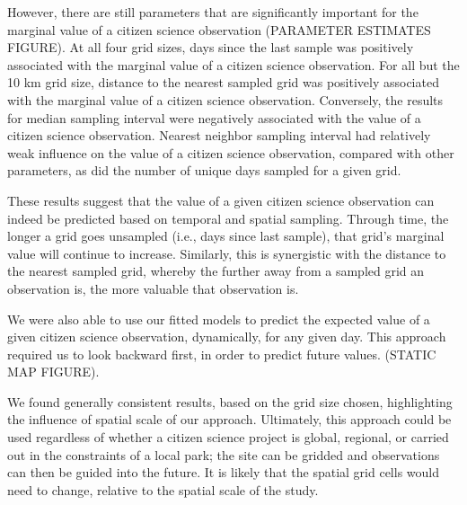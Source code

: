 \documentclass[9pt,twocolumn,twoside,lineno]{pnas-new}
\begin{document}
However, there are still parameters that are significantly important for the marginal value of a citizen science observation (PARAMETER ESTIMATES FIGURE). At all four grid sizes, days since the last sample was positively associated with the marginal value of a citizen science observation. For all but the 10 km grid size, distance to the nearest sampled grid was positively associated with the marginal value of a citizen science observation. Conversely, the results for median sampling interval were negatively associated with the value of a citizen science observation. Nearest neighbor sampling interval had relatively weak influence on the value of a citizen science observation, compared with other parameters, as did the number of unique days sampled for a given grid.

These results suggest that the value of a given citizen science observation can indeed be predicted based on temporal and spatial sampling. Through time, the longer a grid goes unsampled (i.e., days since last sample), that grid's marginal value will continue to increase. Similarly, this is synergistic with the distance to the nearest sampled grid, whereby the further away from a sampled grid an observation is, the more valuable that observation is.

We were also able to use our fitted models to predict the expected value of a given citizen science observation, dynamically, for any given day. This approach required us to look backward first, in order to predict future values. (STATIC MAP FIGURE).

We found generally consistent results, based on the grid size chosen, highlighting the influence of spatial scale of our approach. Ultimately, this approach could be used regardless of whether a citizen science project is global, regional, or carried out in the constraints of a local park; the site can be gridded and observations can then be guided into the future. It is likely that the spatial grid cells would need to change, relative to the spatial scale of the study.
\end{document}
